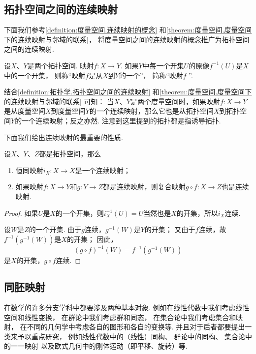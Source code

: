 \subsection{拓扑空间之间的连续映射}
下面我们参考\cref{definition:度量空间.连续映射的概念}
和\cref{theorem:度量空间.度量空间下的连续映射与邻域的联系}，
将度量空间之间的连续映射的概念推广为拓扑空间之间的连续映射.

\begin{definition}\label{definition:拓扑学.拓扑空间之间的连续映射}
设\(X\)、\(Y\)是两个拓扑空间.
映射\(f\colon X \to Y\).
如果\(Y\)中每一个开集\(U\)的原像\(f^{-1}(U)\)是\(X\)中的一个开集，
则称“映射\(f\)是从\(X\)到\(Y\)的一个”，
简称“映射\(f\) ”.
\end{definition}
结合\cref{definition:拓扑学.拓扑空间之间的连续映射} 和\cref{theorem:度量空间.度量空间下的连续映射与邻域的联系} 可知：
当\(X\)、\(Y\)是两个度量空间时，如果映射\(f\colon X \to Y\)是从度量空间\(X\)到度量空间\(Y\)的一个连续映射，那么它也是从拓扑空间\(X\)到拓扑空间\(Y\)的一个连续映射；反之亦然.
注意到这里提到的拓扑都是指诱导拓扑.

下面我们给出连续映射的最重要的性质.

\begin{theorem}\label{theorem:拓扑学.拓扑空间之间的连续映射的性质}
设\(X\)、\(Y\)、\(Z\)都是拓扑空间，那么
\begin{enumerate}
\item 恒同映射\(i_X\colon X \to X\)是一个连续映射；
\item 如果映射\(f\colon X \to Y\)和\(g\colon Y \to Z\)都是连续映射，则复合映射\(g \circ f\colon X \to Z\)也是连续映射.
\end{enumerate}
\begin{proof}
如果\(U\)是\(X\)的一个开集，则\(i_X^{-1}(U) = U\)当然也是\(X\)的开集，所以\(i_X\)连续.

设\(W\)是\(Z\)的一个开集.
由于\(g\)连续，\(g^{-1}(W)\)是\(Y\)的开集；
又由于\(f\)连续，故\(f^{-1}(g^{-1}(W))\)是\(X\)的开集；
因此，\[
(g \circ f)^{-1}(W) = f^{-1}(g^{-1}(W))
\]是\(X\)的开集，\(g \circ f\)连续.
\end{proof}
\end{theorem}

\subsection{同胚映射}
在数学的许多分支学科中都要涉及两种基本对象.
例如在线性代数中我们考虑线性空间和线性变换，
在群论中我们考虑群和同态，
在集合论中我们考虑集合和映射，
在不同的几何学中考虑各自的图形和各自的变换等.
并且对于后者都要提出一类来予以重点研究，
例如线性代数中的（线性）同构、%
群论中的同构、%
集合论中的一一映射%
以及欧式几何中的刚体运动（即平移、旋转）等.

